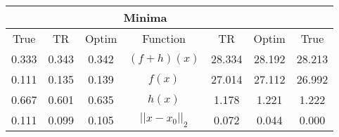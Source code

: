 \begin{tabular}{| c |c |c || c |c |c |c |}
    \hline
    \rowcolor[gray]{0.9}
\multicolumn{3}{|c|}{Parameters} & \multicolumn{4}{|c|}{Minima}\\ \hline True & TR & Optim  & Function & TR & Optim & True \\
    \hline
  \rowcolor[gray]{0.7}
  0.333 & 0.343 & 0.342   & $ (f + h)(x) $ & 28.334 & 28.192 & 28.213 \\
  \rowcolor[gray]{0.8}
  0.111 & 0.135 & 0.139   & $ f(x) $ & 27.014 & 27.112 & 26.992 \\
  \rowcolor[gray]{0.7}
  0.667 & 0.601 & 0.635   & $ h(x) $ & 1.178 & 1.221 & 1.222 \\
  \rowcolor[gray]{0.8}
  0.111 & 0.099 & 0.105   & $ ||x - x_0||_2 $ & 0.072 & 0.044 & 0.000 \\
\end{tabular}
